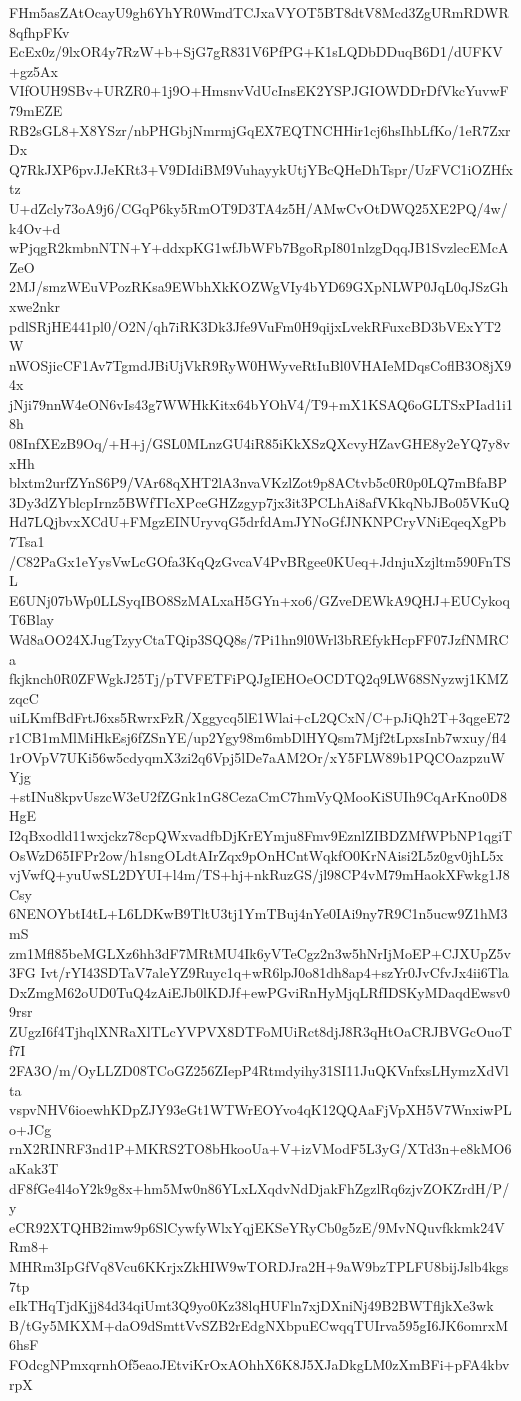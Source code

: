 FHm5asZAtOcayU9gh6YhYR0WmdTCJxaVYOT5BT8dtV8Mcd3ZgURmRDWR8qfhpFKv
EcEx0z/9lxOR4y7RzW+b+SjG7gR831V6PfPG+K1sLQDbDDuqB6D1/dUFKV+gz5Ax
VIfOUH9SBv+URZR0+1j9O+HmsnvVdUcInsEK2YSPJGIOWDDrDfVkcYuvwF79mEZE
RB2sGL8+X8YSzr/nbPHGbjNmrmjGqEX7EQTNCHHir1cj6hsIhbLfKo/1eR7ZxrDx
Q7RkJXP6pvJJeKRt3+V9DIdiBM9VuhayykUtjYBcQHeDhTspr/UzFVC1iOZHfxtz
U+dZcly73oA9j6/CGqP6ky5RmOT9D3TA4z5H/AMwCvOtDWQ25XE2PQ/4w/k4Ov+d
wPjqgR2kmbnNTN+Y+ddxpKG1wfJbWFb7BgoRpI801nlzgDqqJB1SvzlecEMcAZeO
2MJ/smzWEuVPozRKsa9EWbhXkKOZWgVIy4bYD69GXpNLWP0JqL0qJSzGhxwe2nkr
pdlSRjHE441pl0/O2N/qh7iRK3Dk3Jfe9VuFm0H9qijxLvekRFuxcBD3bVExYT2W
nWOSjicCF1Av7TgmdJBiUjVkR9RyW0HWyveRtIuBl0VHAIeMDqsCoflB3O8jX94x
jNji79nnW4eON6vIs43g7WWHkKitx64bYOhV4/T9+mX1KSAQ6oGLTSxPIad1i18h
08InfXEzB9Oq/+H+j/GSL0MLnzGU4iR85iKkXSzQXcvyHZavGHE8y2eYQ7y8vxHh
blxtm2urfZYnS6P9/VAr68qXHT2lA3nvaVKzlZot9p8ACtvb5c0R0p0LQ7mBfaBP
3Dy3dZYblcpIrnz5BWfTIcXPceGHZzgyp7jx3it3PCLhAi8afVKkqNbJBo05VKuQ
Hd7LQjbvxXCdU+FMgzEINUryvqG5drfdAmJYNoGfJNKNPCryVNiEqeqXgPb7Tsa1
/C82PaGx1eYysVwLcGOfa3KqQzGvcaV4PvBRgee0KUeq+JdnjuXzjltm590FnTSL
E6UNj07bWp0LLSyqIBO8SzMALxaH5GYn+xo6/GZveDEWkA9QHJ+EUCykoqT6Blay
Wd8aOO24XJugTzyyCtaTQip3SQQ8s/7Pi1hn9l0Wrl3bREfykHcpFF07JzfNMRCa
fkjknch0R0ZFWgkJ25Tj/pTVFETFiPQJgIEHOeOCDTQ2q9LW68SNyzwj1KMZzqcC
uiLKmfBdFrtJ6xs5RwrxFzR/Xggycq5lE1Wlai+cL2QCxN/C+pJiQh2T+3qgeE72
r1CB1mMlMiHkEsj6fZSnYE/up2Ygy98m6mbDlHYQsm7Mjf2tLpxsInb7wxuy/fl4
1rOVpV7UKi56w5cdyqmX3zi2q6Vpj5lDe7aAM2Or/xY5FLW89b1PQCOazpzuWYjg
+stINu8kpvUszcW3eU2fZGnk1nG8CezaCmC7hmVyQMooKiSUIh9CqArKno0D8HgE
I2qBxodld11wxjckz78cpQWxvadfbDjKrEYmju8Fmv9EznlZIBDZMfWPbNP1qgiT
OsWzD65IFPr2ow/h1sngOLdtAIrZqx9pOnHCntWqkfO0KrNAisi2L5z0gv0jhL5x
vjVwfQ+yuUwSL2DYUI+l4m/TS+hj+nkRuzGS/jl98CP4vM79mHaokXFwkg1J8Csy
6NENOYbtI4tL+L6LDKwB9TltU3tj1YmTBuj4nYe0IAi9ny7R9C1n5ucw9Z1hM3mS
zm1Mfl85beMGLXz6hh3dF7MRtMU4Ik6yVTeCgz2n3w5hNrIjMoEP+CJXUpZ5v3FG
Ivt/rYI43SDTaV7aleYZ9Ruyc1q+wR6lpJ0o81dh8ap4+szYr0JvCfvJx4ii6Tla
DxZmgM62oUD0TuQ4zAiEJb0lKDJf+ewPGviRnHyMjqLRfIDSKyMDaqdEwsv09rsr
ZUgzI6f4TjhqlXNRaXlTLcYVPVX8DTFoMUiRct8djJ8R3qHtOaCRJBVGcOuoTf7I
2FA3O/m/OyLLZD08TCoGZ256ZIepP4Rtmdyihy31SI11JuQKVnfxsLHymzXdVlta
vspvNHV6ioewhKDpZJY93eGt1WTWrEOYvo4qK12QQAaFjVpXH5V7WnxiwPLo+JCg
rnX2RINRF3nd1P+MKRS2TO8bHkooUa+V+izVModF5L3yG/XTd3n+e8kMO6aKak3T
dF8fGe4l4oY2k9g8x+hm5Mw0n86YLxLXqdvNdDjakFhZgzlRq6zjvZOKZrdH/P/y
eCR92XTQHB2imw9p6SlCywfyWlxYqjEKSeYRyCb0g5zE/9MvNQuvfkkmk24VRm8+
MHRm3IpGfVq8Vcu6KKrjxZkHIW9wTORDJra2H+9aW9bzTPLFU8bijJslb4kgs7tp
eIkTHqTjdKjj84d34qiUmt3Q9yo0Kz38lqHUFln7xjDXniNj49B2BWTfljkXe3wk
B/tGy5MKXM+daO9dSmttVvSZB2rEdgNXbpuECwqqTUIrva595gI6JK6omrxM6hsF
FOdcgNPmxqrnhOf5eaoJEtviKrOxAOhhX6K8J5XJaDkgLM0zXmBFi+pFA4kbvrpX
